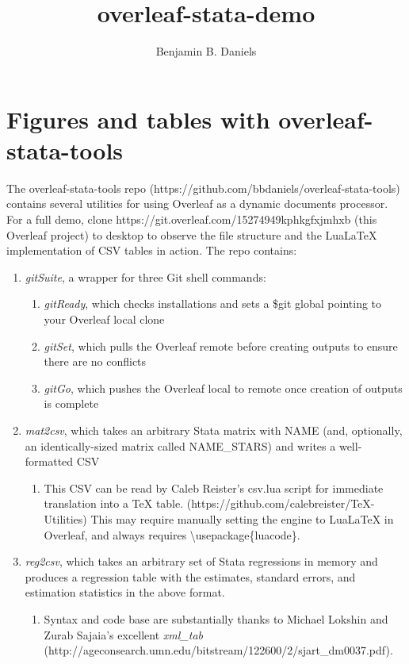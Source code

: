 \documentclass[a4paper]{article}
\title{overleaf-stata-demo}
\author{Benjamin B. Daniels}
\begin{document}
\maketitle

\section{Figures and tables with overleaf-stata-tools}

The overleaf-stata-tools repo (https://github.com/bbdaniels/overleaf-stata-tools) contains several utilities for using Overleaf as a dynamic documents processor. For a full demo, clone https://git.overleaf.com/15274949kphkgfxjmhxb (this Overleaf project) to desktop to observe the file structure and the LuaLaTeX implementation of CSV tables in action. The repo contains:

\begin{enumerate}
\item {\it gitSuite}, a wrapper for three Git shell commands:
	\begin{enumerate}
	\item {\it gitReady}, which checks installations and sets a \${git} global pointing to your Overleaf local clone
    \item {\it gitSet}, which pulls the Overleaf remote before creating outputs to ensure there are no conflicts
    \item {\it gitGo}, which pushes the Overleaf local to remote once creation of outputs is complete
    \end{enumerate}
\item {\it mat2csv}, which takes an arbitrary Stata matrix with NAME (and, optionally, an identically-sized matrix called NAME\_STARS) and writes a well-formatted CSV
	\begin{enumerate}
	\item This CSV can be read by Caleb Reister's csv.lua script for immediate translation into a TeX table. (https://github.com/calebreister/TeX-Utilities) This may require manually setting the engine to LuaLaTeX in Overleaf, and always requires \textbackslash usepackage\{luacode\}.
    \end{enumerate}
\item {\it reg2csv}, which takes an arbitrary set of Stata regressions in memory and produces a regression table with the estimates, standard errors, and estimation statistics in the above format.
	\begin{enumerate}
	\item Syntax and code base are substantially thanks to Michael Lokshin and Zurab Sajaia's excellent {\it xml\_tab} (http://ageconsearch.umn.edu/bitstream/122600/2/sjart\_dm0037.pdf).
    \end{enumerate}
    
\end{enumerate}
\end{document}
